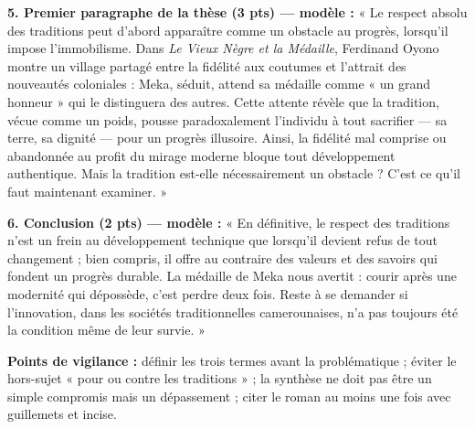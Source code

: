 \documentclass[11pt]{article}
\begin{document}
\begin{corrige}
\textbf{5. Premier paragraphe de la thèse (3 pts) — modèle :} « Le respect absolu des traditions peut d'abord apparaître comme un obstacle au progrès, lorsqu'il impose l'immobilisme. Dans \emph{Le Vieux Nègre et la Médaille}, Ferdinand Oyono montre un village partagé entre la fidélité aux coutumes et l'attrait des nouveautés coloniales : Meka, séduit, attend sa médaille comme « un grand honneur » qui le distinguera des autres. Cette attente révèle que la tradition, vécue comme un poids, pousse paradoxalement l'individu à tout sacrifier — sa terre, sa dignité — pour un progrès illusoire. Ainsi, la fidélité mal comprise ou abandonnée au profit du mirage moderne bloque tout développement authentique. Mais la tradition est-elle nécessairement un obstacle ? C'est ce qu'il faut maintenant examiner. »

\textbf{6. Conclusion (2 pts) — modèle :} « En définitive, le respect des traditions n'est un frein au développement technique que lorsqu'il devient refus de tout changement ; bien compris, il offre au contraire des valeurs et des savoirs qui fondent un progrès durable. La médaille de Meka nous avertit : courir après une modernité qui dépossède, c'est perdre deux fois. Reste à se demander si l'innovation, dans les sociétés traditionnelles camerounaises, n'a pas toujours été la condition même de leur survie. »

\textbf{Points de vigilance :} définir les trois termes avant la problématique ; éviter le hors-sujet « pour ou contre les traditions » ; la synthèse ne doit pas être un simple compromis mais un dépassement ; citer le roman au moins une fois avec guillemets et incise.
\end{corrige}
\end{document}

